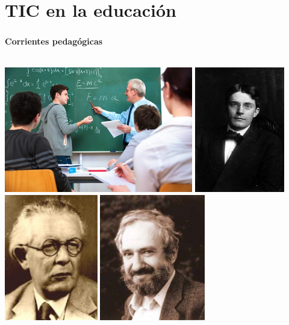 \section{TIC en la educación}
\setcounter{sectiontotal}{3}

\begin{frame}
    \frametitle{\pagetitle}
    \framesubtitle{Corrientes pedagógicas}

    \pause{}
\begin{columns}
 \hspace{0.5cm}
\begin{overprint}
     \includegraphics[width=\textwidth, height=5.5cm]{imagenes/instruccionismo} 
     \includegraphics[width=\textwidth, height=5.5cm]{imagenes/conductismo} 
     \includegraphics[width=\textwidth, height=5.5cm]{imagenes/constructivismo} 
     \includegraphics[width=\textwidth, height=5.5cm]{imagenes/construccionismo} 
\end{overprint}


\end{columns}
\end{frame}

